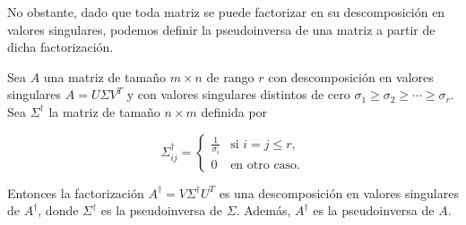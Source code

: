 No obstante, dado que toda matriz se puede factorizar en su descomposición en valores singulares, podemos definir la pseudoinversa de una matriz a partir de dicha factorización.
\begin{definicion}
    Sea $A$ una matriz de tamaño $m \times n$ de rango $r$ con descomposición en valores singulares $A = U \Sigma V^{T}$ y con valores singulares distintos de cero $\sigma_{1} \geq \sigma_{2} \geq \cdots \geq \sigma_{r}$. Sea $\Sigma^{\dagger}$ la matriz de tamaño $n \times m$ definida por

    \[
        \Sigma^{\dagger}_{ij} =
        \begin{cases}
            \frac{1}{\sigma_i} & \text{si } i = j \leq r, \\
            0 & \text{en otro caso.}
        \end{cases}
    \]

    Entonces la factorización $A^{\dagger} = V \Sigma^{\dagger} U^{T}$ es una descomposición en valores singulares de $A^{\dagger}$, donde $\Sigma^{\dagger}$ es la pseudoinversa de $\Sigma$. Además, $A^{\dagger}$ es la pseudoinversa de $A$.\newline
\end{definicion}

